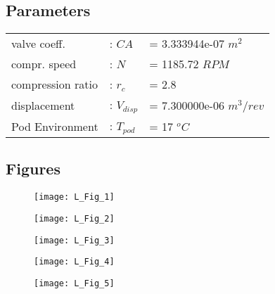 \documentclass[10pt,a4paper]{article}
\author{}
\title{}
\begin{document}
 
\maketitle 
\subsection{Parameters} 

\begin{table}[h] 
\begin{tabular}{lll} 
valve coeff. &: $ CA $ &= 3.333944e-07 $ m^2 $\\ 
compr. speed &: $ N $ &= 1185.72 $ RPM $\\ 
compression ratio &: $ r_c $ &= 2.8 $  $\\ 
displacement &: $ V_{disp} $ &= 7.300000e-06 $ m^3/rev $\\ 
Pod Environment &: $ T_{pod} $ &= 17 $ ^oC $\\ 
\end{tabular} 
\end{table} 

\subsection{Figures} 

\begin{figure}
  \centering
    \texttt{[image: L\_Fig\_1]} 
       \caption{}
\end{figure}
\begin{figure}
  \centering
    \texttt{[image: L\_Fig\_2]} 
       \caption{}
\end{figure}
\begin{figure}
  \centering
    \texttt{[image: L\_Fig\_3]} 
       \caption{}
\end{figure}
\begin{figure}
  \centering
    \texttt{[image: L\_Fig\_4]} 
       \caption{}
\end{figure}
\begin{figure}
  \centering
    \texttt{[image: L\_Fig\_5]} 
       \caption{}
\end{figure}
\end{document}
